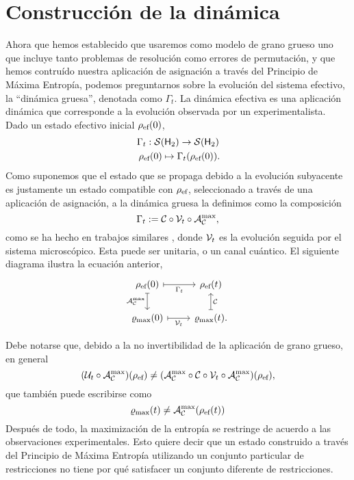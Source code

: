 \section{Construcción de la dinámica}\label{sec:ch2dycon}

Ahora que hemos establecido que usaremos como modelo de grano grueso uno que incluye tanto problemas de resolución como errores de permutación, y que hemos contruído nuestra aplicación de asignación a través del Principio de Máxima Entropía, podemos preguntarnos sobre la evolución del sistema efectivo, la ``dinámica gruesa'', denotada como $\Gamma_t$. La dinámica efectiva es una aplicación dinámica que corresponde a la evolución observada por un experimentalista. Dado un estado efectivo inicial $\rho_{\text{ef}}(0)$,
\begin{gather}
\Gamma_{t}:\mcS(\hilbert_2)\rightarrow \mcS(\hilbert_2)\nonumber\\
\rho_{\ef}(0) \mapsto \Gamma_{t}(\rho_{\ef}(0))\rlap{.}\nonumber
\end{gather}
Como suponemos que el estado que se propaga debido a la evolución subyacente es justamente un estado compatible con $\rho_{\text{ef}}$, seleccionado a través de una aplicación de asignación, a la dinámica gruesa la definimos como la composición
\begin{equation}\label{eq:EffectiveDynamics}
\Gamma_t:=\mathcal{C} \circ \mathcal{V}_t \circ \mathcal{A}_{\mathcal{C}}^{\max},
\end{equation}
como se ha hecho en trabajos similares \cite{CGEmergingDynamics}, donde $\mathcal{V}_{t}$ es la evolución seguida por el sistema microscópico. Esta puede ser unitaria, o un canal cuántico. El siguiente diagrama ilustra la ecuación anterior,
\[\begin{tikzcd}[arrows={<-|}]
    \rho_{\ef}(0)  & \rho_{\ef}(t) \arrow{l}{\Gamma_{t}} \arrow{d}{\mcC}\\
\varrho_{\max}(0) \arrow{u}{\mcA_{\mcC}^{\max}} & \varrho_{\max}(t). \arrow{l}{\mcV_{t}}
\end{tikzcd}
\]


Debe notarse que, debido a la no invertibilidad de la aplicación de grano grueso, en general
\begin{equation}
    (\mathcal{U}_{t}\circ\mathcal{A}_{\mathcal{C}}^{\max})(\rho_{\text{ef}}) \neq (\mathcal{A}_{\mathcal{C}}^{\max}\circ\mathcal{C} \circ \mathcal{V}_{t} \circ \mathcal{A}_{\mathcal{C}}^{\max})(\rho_{\text{ef}}),\nonumber
\end{equation}
que también puede escribirse como
\begin{equation}
    \varrho_{\max}(t)\neq\mathcal{A}_{\mathcal{C}}^{\max}(\rho_{\text{ef}}(t))\nonumber
\end{equation}
Después de todo, la maximización de la entropía se restringe de acuerdo a las observaciones experimentales. Esto quiere decir que un estado construido a través del Principio de Máxima Entropía utilizando un conjunto particular de restricciones no tiene por qué satisfacer un conjunto diferente de restricciones.

